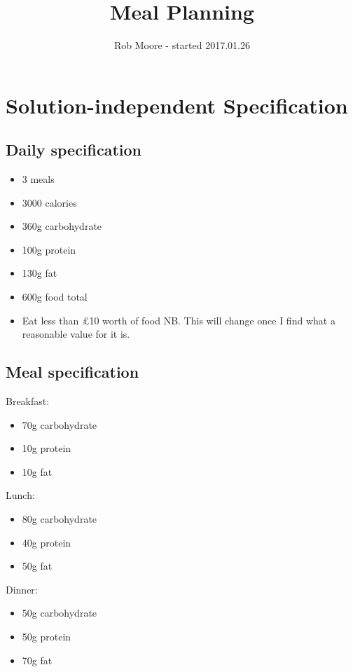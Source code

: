 \documentclass[a4paper]{article}
\title{Meal Planning}
\author{Rob Moore - started 2017.01.26}
\begin{document}
\maketitle

\section{Solution-independent Specification}

\subsection{Daily specification}

\begin{itemize}
  \item 3 meals
  \item 3000 calories
  \item 360g carbohydrate
  \item 100g protein
  \item 130g fat
  \item 600g food total
  \item Eat less than £10 worth of food NB. This will change once I find what a reasonable value for it is.
\end{itemize}

\subsection{Meal specification}

Breakfast:
\begin{itemize}
  \item 70g carbohydrate
  \item 10g protein
  \item 10g fat
\end{itemize}

Lunch:
\begin{itemize}
  \item 80g carbohydrate
  \item 40g protein
  \item 50g fat
\end{itemize}

Dinner:
\begin{itemize}
  \item 50g carbohydrate
  \item 50g protein
  \item 70g fat
\end{itemize}
\end{document}
